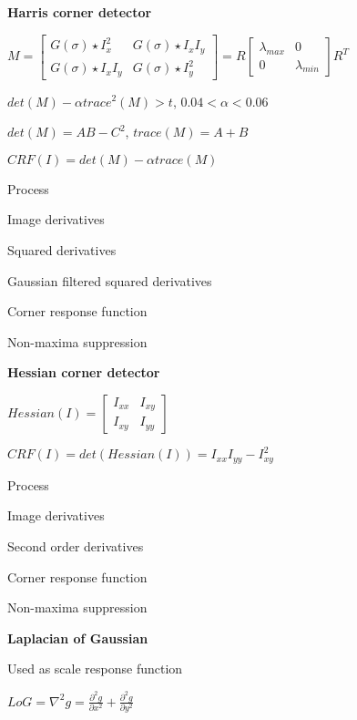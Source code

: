 \documentclass{article}
\begin{document}
\begin{multicols*}{2}
{	\textbf{Harris corner detector}

	$ M = \left[\begin{array}{cc}
				G(\sigma) \star I_x^2  & G(\sigma) \star I_xI_y \\
				G(\sigma) \star I_xI_y & G(\sigma) \star I_y^2
			\end{array}\right] = R \left[ \begin{array}{cc}
				\lambda_{max} & 0             \\
				0             & \lambda_{min}
			\end{array} \right] R^T$

	$det(M) - \alpha trace^2(M) > t$, $0.04 < \alpha < 0.06$

	$det(M) = AB - C^2$, $trace(M) = A + B$

	$CRF(I) = det(M) - \alpha trace(M)$

	Process

	\begin{compactenum}
		\item Image derivatives
		\item Squared derivatives
		\item Gaussian filtered squared derivatives
		\item Corner response function
		\item Non-maxima suppression
	\end{compactenum}

	\textbf{Hessian corner detector}

	$Hessian(I) = \left[\begin{array}{cc}
				I_{xx} & I_{xy} \\
				I_{xy} & I_{yy}
			\end{array}\right]$

	$CRF(I) = det(Hessian(I)) = I_{xx}I_{yy} - I^2_{xy}$

	Process

	\begin{compactenum}
		\item Image derivatives
		\item Second order derivatives
		\item Corner response function
		\item Non-maxima suppression
	\end{compactenum}

	\textbf{Laplacian of Gaussian}

	Used as scale response function

	$LoG = \nabla^2g = \frac{\partial^2g}{\partial x^2} + \frac{\partial^2g}{\partial y^2}$

}
\end{multicols*}
\end{document}
